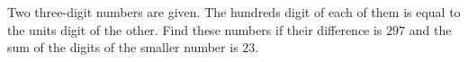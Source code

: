 Two three-digit numbers are given. The hundreds digit of each of them is equal to the units digit of the other. Find these numbers if their difference is $297$ and the sum of the digits of the smaller number is $23$.
